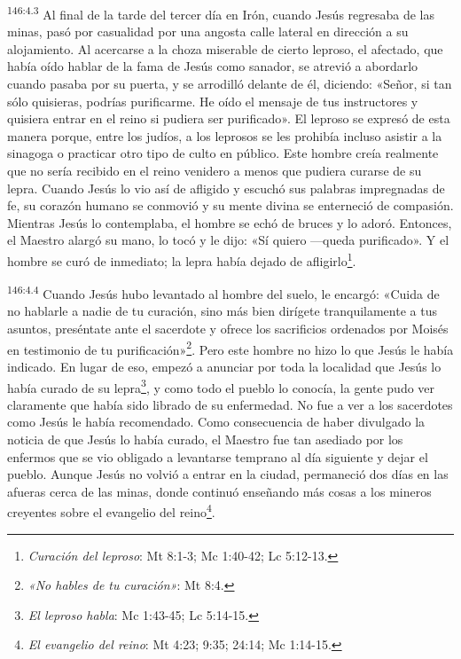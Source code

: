 \par 
\textsuperscript{146:4.3} Al final de la tarde del tercer día en Irón, cuando Jesús regresaba de las minas, pasó por casualidad por una angosta calle lateral en dirección a su alojamiento. Al acercarse a la choza miserable de cierto leproso, el afectado, que había oído hablar de la fama de Jesús como sanador, se atrevió a abordarlo cuando pasaba por su puerta, y se arrodilló delante de él, diciendo: «Señor, si tan sólo quisieras, podrías purificarme. He oído el mensaje de tus instructores y quisiera entrar en el reino si pudiera ser purificado». El leproso se expresó de esta manera porque, entre los judíos, a los leprosos se les prohibía incluso asistir a la sinagoga o practicar otro tipo de culto en público. Este hombre creía realmente que no sería recibido en el reino venidero a menos que pudiera curarse de su lepra. Cuando Jesús lo vio así de afligido y escuchó sus palabras impregnadas de fe, su corazón humano se conmovió y su mente divina se enterneció de compasión. Mientras Jesús lo contemplaba, el hombre se echó de bruces y lo adoró. Entonces, el Maestro alargó su mano, lo tocó y le dijo: «Sí quiero ---queda purificado». Y el hombre se curó de inmediato; la lepra había dejado de afligirlo\footnote{\textit{Curación del leproso}: Mt 8:1-3; Mc 1:40-42; Lc 5:12-13.}.

\par 
\textsuperscript{146:4.4} Cuando Jesús hubo levantado al hombre del suelo, le encargó: «Cuida de no hablarle a nadie de tu curación, sino más bien dirígete tranquilamente a tus asuntos, preséntate ante el sacerdote y ofrece los sacrificios ordenados por Moisés en testimonio de tu purificación»\footnote{\textit{«No hables de tu curación»}: Mt 8:4.}. Pero este hombre no hizo lo que Jesús le había indicado. En lugar de eso, empezó a anunciar por toda la localidad que Jesús lo había curado de su lepra\footnote{\textit{El leproso habla}: Mc 1:43-45; Lc 5:14-15.}, y como todo el pueblo lo conocía, la gente pudo ver claramente que había sido librado de su enfermedad. No fue a ver a los sacerdotes como Jesús le había recomendado. Como consecuencia de haber divulgado la noticia de que Jesús lo había curado, el Maestro fue tan asediado por los enfermos que se vio obligado a levantarse temprano al día siguiente y dejar el pueblo. Aunque Jesús no volvió a entrar en la ciudad, permaneció dos días en las afueras cerca de las minas, donde continuó enseñando más cosas a los mineros creyentes sobre el evangelio del reino\footnote{\textit{El evangelio del reino}: Mt 4:23; 9:35; 24:14; Mc 1:14-15.}.

